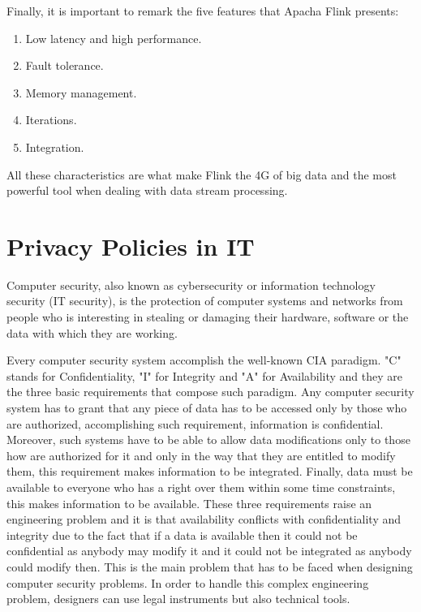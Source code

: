 Finally, it is important to remark the five features that Apacha Flink presents:

\begin{enumerate}

\item Low latency and high performance.
\item Fault tolerance.
\item Memory management.
\item Iterations.
\item Integration.

\end{enumerate}

All these characteristics are what make Flink the 4G of big data and the most powerful tool when dealing with data stream processing.

\section{Privacy Policies in IT}

Computer security, also known as cybersecurity or information technology security (IT security), is the protection of computer systems and networks from people who is interesting in stealing or damaging their hardware, software or the data with which they are working.

Every computer security system accomplish the well-known CIA paradigm. "C" stands for Confidentiality, "I" for Integrity and "A" for Availability and they are the three basic requirements that compose such paradigm. Any computer security system has to grant that any piece of data has to be accessed only by those who are authorized, accomplishing such requirement, information is confidential. Moreover, such systems have to be able to allow data modifications only to those how are authorized for it and only in the way that they are entitled to modify them, this requirement makes information to be integrated. Finally, data must be available to everyone who has a right over them within some time constraints, this makes information to be available. These three requirements raise an engineering problem and it is that availability conflicts with confidentiality and integrity due to the fact that if a data is available then it could not be confidential as anybody may modify it and it could not be integrated as anybody could modify then. This is the main problem that has to be faced when designing computer security problems. In order to handle this complex engineering problem, designers can use legal instruments but also technical tools.

